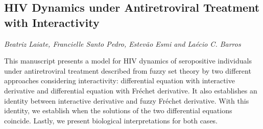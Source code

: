 \documentclass[../booklet.tex]{subfiles}
\begin{document}
\subsection[HIV Dynamics under Antiretroviral Treatment with Interactivity. {\it Beatriz Laiate, Francielle Santo Pedro, Estevão Esmi and Laécio C. Barros}]{HIV Dynamics under Antiretroviral Treatment with Interactivity}
   

\begin{center}
  {\it Beatriz Laiate, Francielle Santo Pedro, Estevão Esmi and Laécio C. Barros}
\end{center}

\vskip 0.8cm


This manuscript presents a model for HIV dynamics of seropositive individuals under antiretroviral treatment described from fuzzy set theory by two different approaches considering interactivity: differential equation with interactive derivative and differential equation with Fr\'echet derivative. It also establishes an identity between interactive derivative and fuzzy Fr\'echet derivative. With this identity, we establish when the solutions of the two differential equations coincide. Lastly, we present biological interpretations for both cases.

\end{document}
